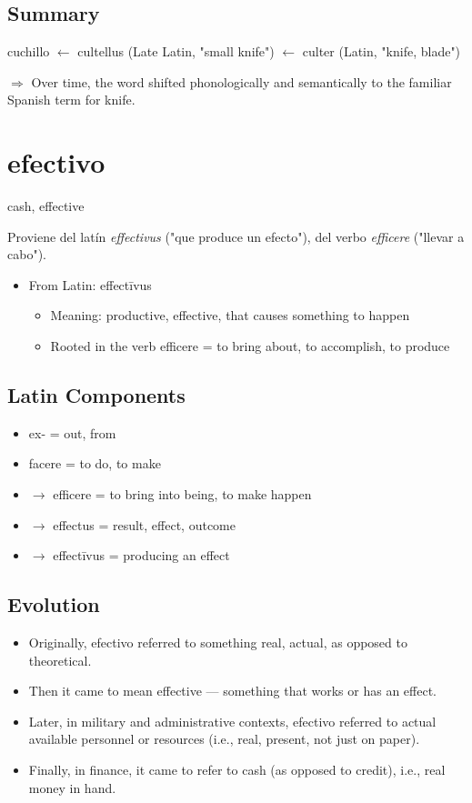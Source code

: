 \documentclass[10pt]{book}
\newcommand{\wordentry}[2]{
	\large #1
	\vspace{-0.5em}
	\begin{etymologybox}
		#2
	\end{etymologybox}
}
\let\oldsection\section
\renewcommand{\section}[1]{
	\needspace{8\baselineskip}
	\oldsection{#1}
}
\begin{document}
	\subsection{Summary}
	cuchillo $\leftarrow$ cultellus (Late Latin, "small knife") $\leftarrow$ culter (Latin, "knife, blade")
	
	$\Rightarrow$ Over time, the word shifted phonologically and semantically to the familiar Spanish term for knife.
	
	\section{efectivo}
	\wordentry{cash, effective}{
	Proviene del latín \textit{effectivus} ("que produce un efecto"), del verbo \textit{efficere} ("llevar a cabo").
	
	\begin{itemize}
		\item From Latin: effectīvus
		\begin{itemize}
			\item Meaning: productive, effective, that causes something to happen
			\item Rooted in the verb efficere = to bring about, to accomplish, to produce
		\end{itemize}
	\end{itemize}
	}
	
	\subsection{Latin Components}
	
	\begin{itemize}
		\item ex- = out, from
		\item facere = to do, to make
		\item $\rightarrow$ efficere = to bring into being, to make happen
		\item $\rightarrow$ effectus = result, effect, outcome
		\item $\rightarrow$ effectīvus = producing an effect
	\end{itemize}
	
	\subsection{Evolution}
	
	\begin{itemize}
		\item Originally, efectivo referred to something real, actual, as opposed to theoretical.
		\item Then it came to mean effective — something that works or has an effect.
		\item Later, in military and administrative contexts, efectivo referred to actual available personnel or resources (i.e., real, present, not just on paper).
		\item Finally, in finance, it came to refer to cash (as opposed to credit), i.e., real money in hand.
	\end{itemize}
	
\end{document}
